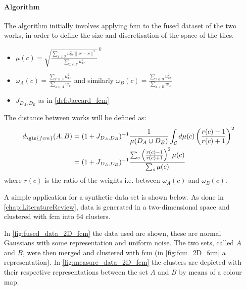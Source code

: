 \paragraph{Algorithm}
The algorithm initially involves applying \gls{fcm} to the fused dataset of the two works, in order to define the size and discretisation of the space of the tiles.
\begin{itemize}
	\item $ \mu(c) = {\sqrt{\frac{\sum_{x\in\mathcal{S}} u_{xc}^2 \|x-c\|^2}{\sum_{x\in\mathcal{S}}u_{xc}^2}}\,}^k $
	\item $ \omega_A(c) = \frac{\sum_{x\in A} u_{xc}^2}{\sum_{x\in A}w_x} $ and similarly $ \omega_B(c) = \frac{\sum_{x\in B} u_{xc}^2}{\sum_{x\in B}w_x} $
	\item $ J_{D_A, D_B} $ as in \cref{def:Jaccard_fcm}
\end{itemize}
The distance between works will be defined as:
\begin{align}
\label{eq:fuzzy_distance}
	d_{\gls{fcm}}(A, B) &= (1 + J_{D_A, D_B})^{-1} \frac{1}{\mu(D_A\cup D_B)}\int_\mathcal{C} d\mu(c) \left(\frac{r(c)-1}{r(c)+1}\right)^2 \nonumber\\
	&= (1 + J_{D_A, D_B})^{-1}\frac{\sum_c \left(\frac{r(c)-1}{r(c)+1}\right)^2 \mu(c)}{\sum_c \mu(c)}
\end{align}
where $r(c)$ is the ratio of the weights i.e. between $\omega_A(c)$ and $\omega_B(c)$.

\noindent A simple application for a synthetic data set is shown below. As done in \cref{chap:LiteratureReview}, data is generated in a two-dimensional space and clustered with \gls{fcm} into $64$ clusters.

\noindent In \cref{fig:fused_data_2D_fcm} the data used are shown, these are normal Gaussians with some representation and uniform noise. The two sets, called $A$ and $B$, were then merged and clustered with \gls{fcm} (in \cref{fig:fcm_2D_fcm} a representation). In \cref{fig:measure_data_2D_fcm} the clusters are depicted with their respective representations between the set $A$ and $B$ by means of a colour map.

